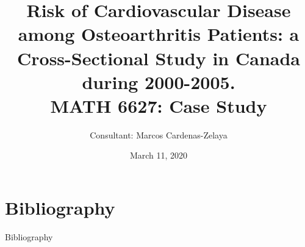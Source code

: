 \documentclass{beamer}
\title[]{Risk of Cardiovascular Disease among Osteoarthritis Patients: a Cross-Sectional Study in Canada during 2000-2005.\\ 
{
\medskip
}
\small MATH 6627: Case Study}
\author{Consultant: Marcos Cardenas-Zelaya} %

{

\medskip

}
\date{March 11, 2020} %
\begin{document}
	
\section{Bibliography}
\begin{frame}{Bibliography}
	\printbibliography
\end{frame}
\end{document}
